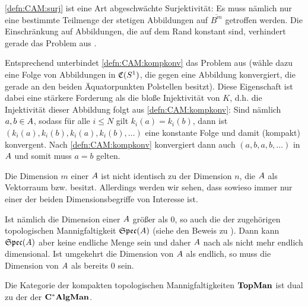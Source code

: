 \begin{bem}
\ref{defn:CAM:surj} ist eine Art abgeschwächte Surjektivität: Es muss nämlich nur eine bestimmte Teilmenge der stetigen Abbildungen auf $\overline{B^m}$ getroffen werden. Die Einschränkung auf Abbildungen, die auf dem Rand konstant sind, verhindert gerade das Problem aus .

Entsprechend unterbindet \ref{defn:CAM:kompkonv} das Problem aus  (wähle dazu eine Folge von Abbildungen in $\mathfrak{C}(S^1)$, die gegen eine Abbildung konvergiert, die gerade an den beiden Äquatorpunkten Polstellen besitzt). Diese Eigenschaft ist dabei eine stärkere Forderung als die bloße Injektivität von $K$, d.h. die Injektivität dieser Abbildung folgt aus \ref*{defn:CAM:kompkonv}: Sind nämlich $a,b \in A$, sodass für alle $i \leq N$ gilt $k_i(a) = k_i(b)$, dann ist $(k_i(a), k_i(b), k_i(a), k_i(b), \dots)$ eine konstante Folge und damit (kompakt) konvergent. Nach \ref*{defn:CAM:kompkonv} konvergiert dann auch $(a, b, a, b, \dots)$ in $A$ und somit muss $a = b$ gelten.
\end{bem}

\begin{bem}
Die Dimension $m$ einer \CAlgMan{} $A$ ist nicht identisch zu der Dimension $n$, die $A$ als Vektorraum bzw. \CAlg{} besitzt. Allerdings werden wir sehen, dass sowieso immer nur einer der beiden Dimensionsbegriffe von Interesse ist. 

Ist nämlich die Dimension einer \CAlgMan{} $A$ größer als $0$, so auch die der zugehörigen topologischen Mannigfaltigkeit $\mathfrak{Spec}(A)$ (siehe den Beweis zu ). Dann kann $\mathfrak{Spec}(A)$ aber keine endliche Menge sein und daher $A$ nach  als \CAlg{} nicht mehr endlich dimensional. Ist umgekehrt die Dimension von $A$ als \CAlg{} endlich, so muss die Dimension von $A$ als \CAlgMan{} bereits $0$ sein.
\end{bem}

\begin{satz}\label{satz:GD2}
Die Kategorie der kompakten topologischen Mannigfaltigkeiten $\mathbf{TopMan}$ ist dual zu der der \CAlgMann{} $\mathbf{C^*AlgMan}$.
\end{satz}

